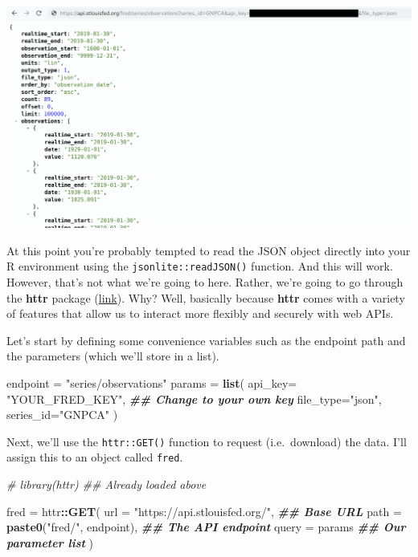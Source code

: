 \documentclass[
]{article}
\newenvironment{Shaded}{\begin{snugshade}}{\end{snugshade}}
\newcommand{\AttributeTok}[1]{\textcolor[rgb]{0.13,0.29,0.53}{#1}}
\newcommand{\CommentTok}[1]{\textcolor[rgb]{0.56,0.35,0.01}{\textit{#1}}}
\newcommand{\DocumentationTok}[1]{\textcolor[rgb]{0.56,0.35,0.01}{\textbf{\textit{#1}}}}
\newcommand{\FunctionTok}[1]{\textcolor[rgb]{0.13,0.29,0.53}{\textbf{#1}}}
\newcommand{\NormalTok}[1]{#1}
\newcommand{\OtherTok}[1]{\textcolor[rgb]{0.56,0.35,0.01}{#1}}
\newcommand{\SpecialCharTok}[1]{\textcolor[rgb]{0.81,0.36,0.00}{\textbf{#1}}}
\newcommand{\StringTok}[1]{\textcolor[rgb]{0.31,0.60,0.02}{#1}}
\begin{document}
\includegraphics{pics/fred-redacted.png}

At this point you're probably tempted to read the JSON object directly
into your R environment using the \texttt{jsonlite::readJSON()}
function. And this will work. However, that's not what we're going to
here. Rather, we're going to go through the \textbf{httr} package
(\href{https://httr.r-lib.org/}{link}). Why? Well, basically because
\textbf{httr} comes with a variety of features that allow us to interact
more flexibly and securely with web APIs.

Let's start by defining some convenience variables such as the endpoint
path and the parameters (which we'll store in a list).

\begin{Shaded}
\begin{Highlighting}[]
\NormalTok{endpoint }\OtherTok{=} \StringTok{"series/observations"}
\NormalTok{params }\OtherTok{=} \FunctionTok{list}\NormalTok{(}
  \AttributeTok{api\_key=} \StringTok{"YOUR\_FRED\_KEY"}\NormalTok{, }\DocumentationTok{\#\# Change to your own key}
  \AttributeTok{file\_type=}\StringTok{"json"}\NormalTok{, }
  \AttributeTok{series\_id=}\StringTok{"GNPCA"}
\NormalTok{  )}
\end{Highlighting}
\end{Shaded}

Next, we'll use the \texttt{httr::GET()} function to request
(i.e.~download) the data. I'll assign this to an object called
\texttt{fred}.

\begin{Shaded}
\begin{Highlighting}[]
\CommentTok{\# library(httr) \#\# Already loaded above}

\NormalTok{fred }\OtherTok{=} 
\NormalTok{  httr}\SpecialCharTok{::}\FunctionTok{GET}\NormalTok{(}
    \AttributeTok{url =} \StringTok{"https://api.stlouisfed.org/"}\NormalTok{, }\DocumentationTok{\#\# Base URL}
    \AttributeTok{path =} \FunctionTok{paste0}\NormalTok{(}\StringTok{"fred/"}\NormalTok{, endpoint),    }\DocumentationTok{\#\# The API endpoint}
    \AttributeTok{query =}\NormalTok{ params                       }\DocumentationTok{\#\# Our parameter list}
\NormalTok{    )}
\end{Highlighting}
\end{Shaded}
\end{document}
